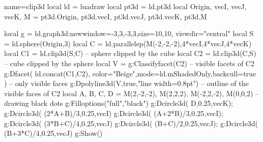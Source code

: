 \begin{luadraw}{name=clip3d}
local ld = luadraw
local pt3d = ld.pt3d
local Origin, vecI, vecJ, vecK, M = pt3d.Origin, pt3d.vecI, pt3d.vecJ, pt3d.vecK, pt3d.M

local g = ld.graph3d:new{window={-3,3,-3,3},size={10,10}, viewdir="central"}
local S = ld.sphere(Origin,3)
local C = ld.parallelep(M(-2,-2,-2),4*vecI,4*vecJ,4*vecK)
local C1 = ld.clip3d(S,C) -- sphere clipped by the cube
local C2 = ld.clip3d(C,S) -- cube clipped by the sphere
local V = g:Classifyfacet(C2) -- visible facets of C2
g:Dfacet( ld.concat(C1,C2), {color="Beige",mode=ld.mShadedOnly,backcull=true} ) -- only visible faces
g:Dpolyline3d(V,true,"line width=0.8pt") -- outline of the visible faces of C2
local A, B, C, D = M(2,-2,-2), M(2,2,2), M(-2,2,-2), M(0,0,2) -- drawing black dots
g:Filloptions("full","black")
g:Dcircle3d( D,0.25,vecK); g:Dcircle3d( (2*A+B)/3,0.25,vecI)
g:Dcircle3d( (A+2*B)/3,0.25,vecI); g:Dcircle3d( (3*B+C)/4,0.25,vecJ)
g:Dcircle3d( (B+C)/2,0.25,vecJ); g:Dcircle3d( (B+3*C)/4,0.25,vecJ)
g:Show()
\end{luadraw}
